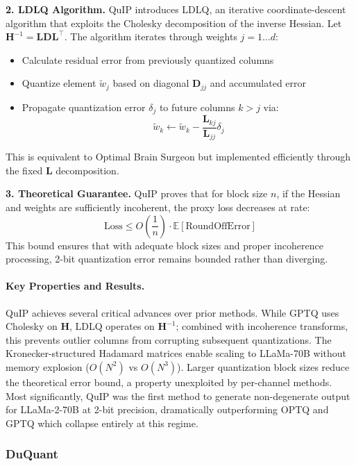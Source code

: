 \textbf{2. LDLQ Algorithm.} QuIP introduces LDLQ, an iterative coordinate-descent algorithm that exploits the Cholesky decomposition of the inverse Hessian. Let $\bm{H}^{-1} = \bm{L}\bm{D}\bm{L}^\top$. The algorithm iterates through weights $j = 1 \dots d$:
\begin{itemize}
\item Calculate residual error from previously quantized columns
\item Quantize element $\tilde{w}_{j}$ based on diagonal $\bm{D}_{jj}$ and accumulated error
\item Propagate quantization error $\delta_j$ to future columns $k > j$ via:
  \begin{equation}
    \tilde{w}_k \leftarrow \tilde{w}_k - \frac{\bm{L}_{kj}}{\bm{L}_{jj}} \delta_j
  \end{equation}
\end{itemize}
This is equivalent to Optimal Brain Surgeon but implemented efficiently through the fixed $\bm{L}$ decomposition.

\textbf{3. Theoretical Guarantee.} QuIP proves that for block size $n$, if the Hessian and weights are sufficiently incoherent, the proxy loss decreases at rate:
\begin{equation}
\text{Loss} \le O\left(\frac{1}{n}\right) \cdot \mathbb{E}[\text{RoundOffError}]
\end{equation}
This bound ensures that with adequate block sizes and proper incoherence processing, 2-bit quantization error remains bounded rather than diverging.

\paragraph{Key Properties and Results.}
QuIP achieves several critical advances over prior methods. While GPTQ uses Cholesky on $\bm{H}$, LDLQ operates on $\bm{H}^{-1}$; combined with incoherence transforms, this prevents outlier columns from corrupting subsequent quantizations. The Kronecker-structured Hadamard matrices enable scaling to LLaMa-70B without memory explosion ($O(N^2)$ vs $O(N^3)$). Larger quantization block sizes reduce the theoretical error bound, a property unexploited by per-channel methods. Most significantly, QuIP was the first method to generate non-degenerate output for LLaMa-2-70B at 2-bit precision, dramatically outperforming OPTQ and GPTQ which collapse entirely at this regime.

\subsubsection{DuQuant \cite{lin2024duquantdistributingoutliersdual}}

